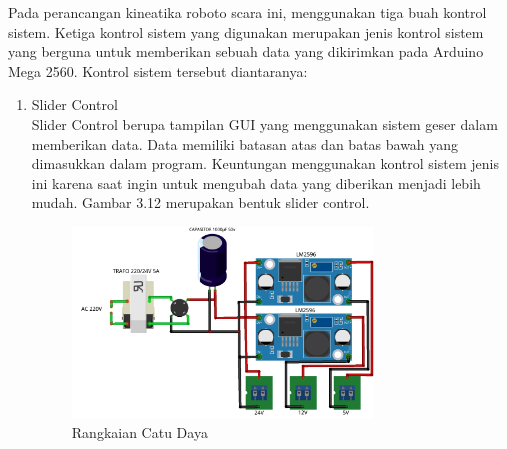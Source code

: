 Pada perancangan kineatika roboto scara ini, menggunakan tiga buah kontrol sistem. Ketiga kontrol sistem yang digunakan merupakan jenis kontrol sistem yang berguna untuk memberikan sebuah data yang dikirimkan pada Arduino Mega 2560. Kontrol sistem tersebut diantaranya:
\begin{enumerate}
	\item Slider Control \\
	Slider Control berupa tampilan GUI yang menggunakan sistem geser dalam memberikan data. Data memiliki batasan atas dan batas bawah yang dimasukkan dalam program. Keuntungan menggunakan kontrol sistem jenis ini karena saat ingin untuk mengubah data yang diberikan menjadi lebih mudah.
	Gambar 3.12 merupakan bentuk slider control.
	\begin{figure}[H]
		\centering
		\includegraphics[width=8cm]{gambar/catudaya_bb.png}
		\caption{Rangkaian Catu Daya}
	\end{figure}

	
	
\end{enumerate}

